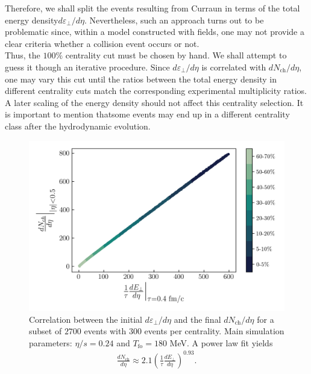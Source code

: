 Therefore, we shall split the events resulting from {\sffamily Curraun} in terms of the total energy density$d\varepsilon_\perp/d\eta$. Nevertheless, such an approach turns out to be problematic since, within a model constructed with fields, one may not provide a clear criteria whether a collision event occurs or not. \\

Thus, the $100\%$ centrality cut must be chosen by hand. We shall attempt to guess it though an iterative procedure. Since $d\varepsilon_\perp/d\eta$ is correlated with $dN_\text{ch}/d\eta$, one may vary this cut until the ratios between the total energy density in different centrality cuts match the corresponding experimental multiplicity ratios. A later scaling of the energy density should not affect this centrality selection. It is important to mention thatsome events may end up in a different centrality class after the hydrodynamic evolution.

\begin{figure}[!hbt]
	\includegraphics[width=\textwidth]{images/dnch_etot.png}
	\caption{\normalsize Correlation between the initial $d\varepsilon_\perp/d\eta$ and the final $dN_\mathrm{ch}/d\eta$ for a subset of $2700$ events with $300$ events per centrality. Main simulation parameters: $\eta/s=0.24$ and $T_\mathrm{fo}=180$ MeV. A power law fit yields
	\begin{align*}
	    \frac{dN_\text{ch}}{d\eta}\approx 2.1 \left(\frac{1}{\tau}\frac{dE_\perp}{d\eta}\right)^{0.93}.
	\end{align*}
	} 
\end{figure}

